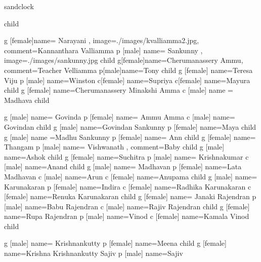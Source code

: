 \documentclass{article}
\begin{document}
\begin{landscape}
\begin{genealogypicture} [
processing=database,
database format=medium marriage below,
node size=2.4cm,
level size=3.5cm,
level distance=6mm,
list separators hang,
name font=\bfseries,
surn code={\textcolor{red!50!black}{#1}},
place text={\newline}{},
date format=d/mon/yyyy,
tcbset={male/.style={colframe=blue,colback=blue!5},
female/.style={colframe=red,colback=red!5}},
box={fit basedim=7pt,boxsep=2pt,segmentation style=solid,
halign=left,before upper=\parskip1pt,
\gtrDBsex,drop fuzzy shadow,
if image defined={add to width=25mm,right=25mm,
underlay={\begin{tcbclipinterior}\path[fill overzoom DBimage]
([xshift=-24mm]interior.south east) rectangle (interior.north east);
\end{tcbclipinterior}},
}{},
},
]

sandclock {
	child {
  		g [female]{name={ Narayani }, image={./images/kvalliamma2.jpg}, comment={Kannanthara Valliamma}}
   		p [male] {name={ Sankunny }, image={./images/sankunny.jpg}}
		child {
  			g[female]{name=Cherumanassery Ammu, comment={Teacher Velliamma}}
   			p[male]{name={Tony }}
   			child {
    				g [female] {name=Teresa Viju }
    				p [male] {name=Winston }
				c[female] {name={Supriya }}
				c[female] {name={Mayura }}
   			}
  		}
		child {
			g [female] {name={Cherumanassery Minakshi Amma}}
			c [male] {name ={ Madhava }}
		}
		child {
			g [male] {name={ Govinda }}
			p [female] {name={ Ammu Amma}}
			c [male] {name={ Govindan }}
			child {
				g [male] {name={Govindan Sankunny}}
				p [female] {name=Maya}
				child {
					g [male] {name ={Madhu Sankunny}}
					p [female] {name={ Ann}}
				}
			}
			child {
				g [female] {name={ Thangam }}
				p [male] {name={ Vishwanath }, comment={Baby}}
				child {
					g [male] {name={Ashok }}
				}
				child {
					g [female] {name={Suchitra }}
					p [male] {name={ Krishnakumar}}
				}
				c [male] {name={Anand }}
			}
			child {
				g [male] {name={ Madhavan}}
				p [female] {name={Lata Madhavan }}
				c [male] {name={Arun }}
				c [female] {name={Anupama }}
			}
			child {
				g [male] {name={ Karunakaran}}
				p [female] {name=Indira}
				c [female] {name={Radhika Karunakaran}}
				c [female] {name={Renuka Karunakaran}}
			}
			child {
				g [female] {name={ Janaki Rajendran}}
				p [male] {name={Babu Rajendran}}
				c [male] {name={Rajiv Rajendran}}
				child {
					g [female] {name={Rupa Rajendran}}
					p [male] {name=Vinod}
					c [female] {name={Kamala Vinod}}
				}
			}
			child {
				g [male] {name={ Krishnankutty}}
				p [female] {name=Meena}
				child {
					g [female] {name={Krishna Krishnankutty Sajiv}}
					p [male] {name=Sajiv}
				}
			
}}}}
\end{genealogypicture}
\end{landscape}
\end{document}
